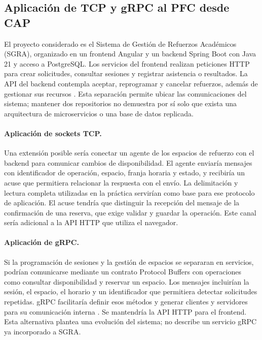 \subsection{Aplicación de TCP y gRPC al PFC desde CAP}
\label{sec:pfc-sgra}

El proyecto considerado es el Sistema de Gestión de Refuerzos Académicos
(SGRA), organizado en un frontend Angular y un backend Spring Boot con Java 21
y acceso a PostgreSQL. Los servicios del frontend realizan peticiones HTTP para
crear solicitudes, consultar sesiones y registrar asistencia o resultados. La
API del backend contempla aceptar, reprogramar y cancelar refuerzos, además de
gestionar sus recursos \cite{belinda_sgra_front,belinda_sgra_back}.
Esta separación permite ubicar las comunicaciones del sistema; mantener dos
repositorios no demuestra por sí solo que exista una arquitectura de
microservicios o una base de datos replicada.

\paragraph{Aplicación de sockets TCP.}
Una extensión posible sería conectar un agente de los espacios de refuerzo con
el backend para comunicar cambios de disponibilidad. El agente enviaría mensajes
con identificador de operación, espacio, franja horaria y estado, y recibiría un
acuse que permitiera relacionar la respuesta con el envío. La delimitación y
lectura completa utilizadas en la práctica servirían como base para ese protocolo
de aplicación. El acuse tendría que distinguir la recepción del mensaje de la
confirmación de una reserva, que exige validar y guardar la operación.
Este canal sería adicional a la API HTTP que utiliza el navegador.

\paragraph{Aplicación de gRPC.}
Si la programación de sesiones y la gestión de espacios se separaran en
servicios, podrían comunicarse mediante un contrato Protocol Buffers con
operaciones como consultar disponibilidad y reservar un espacio. Los mensajes
incluirían la sesión, el espacio, el horario y un identificador que permitiera
detectar solicitudes repetidas. gRPC facilitaría definir esos métodos y generar
clientes y servidores para su comunicación interna
\cite{belinda_grpc_introduccion}. Se mantendría la API HTTP para el frontend.
Esta alternativa plantea una evolución del sistema; no describe un servicio
gRPC ya incorporado a SGRA.

